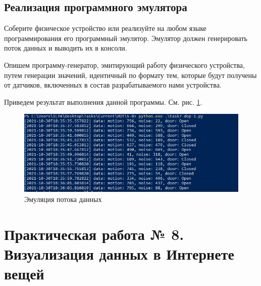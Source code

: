 \documentclass[a4paper,14pt]{extarticle}
\begin{document}
\subsection{Реализация программного эмулятора}
\begin{problem}
	Соберите физическое устройство или реализуйте на любом языке программирования его
	программный эмулятор. Эмулятор должен генерировать поток данных и выводить их в
	консоли.
	
	\nonum Опишем программу-генератор, эмитирующий работу физического устройства, путем генерации значений, идентичный по формату тем, которые будут получены от датчиков, включенных в состав разрабатываемого нами устройства. 
	
	
	
	Приведем результат выполнения данной программы. См. рис. \ref{fig:dop-res-1}.
	
	\begin{figure}[htpb]
		\centering
		\includegraphics[width=0.7\linewidth]{images/dop-res-1}
		\caption{Эмуляция потока данных}
		\label{fig:dop-res-1}
	\end{figure}
\end{problem}

\newpage
\section{Практическая работа № 8. Визуализация данных в Интернете вещей}
\end{document}
